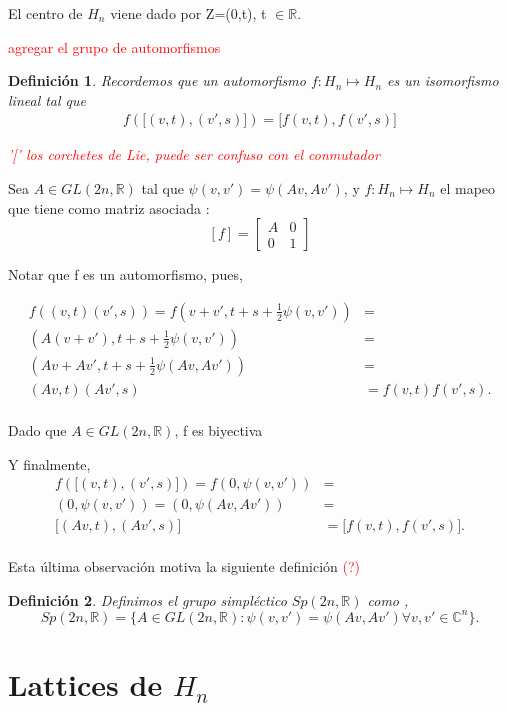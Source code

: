 \documentclass[12pt]{article}
\newtheorem{definition}{Definición}
\begin{document}
El centro de $H_{n}$ viene dado por Z=(0,t), t $\in \mathbb{R}.$

\textcolor{red}{agregar el grupo de automorfismos }
\begin{definition}
 Recordemos que un automorfismo $f: H_n \mapsto H_n$ es un isomorfismo lineal tal que 
 $$\begin{aligned}
    f({[}(v,t),(v',s){]})={[}f(v,t),f(v',s){]}
 \end{aligned}$$
 
 \textcolor{red}{ '[' los corchetes de Lie, puede ser confuso con el conmutador}
\end{definition}

Sea $A \in GL(2n,\mathbb{R})$ tal que  $\psi(v,v')=\psi(Av, Av')$, y  $f:H_n \mapsto H_n$ el mapeo
que tiene como matriz asociada :
$$[f] = 
\begin{bmatrix}
A & 0\\
0 & 1
\end{bmatrix}$$

Notar que f es un automorfismo, pues,

$$\begin{aligned}
f((v,t) (v',s))=f(v+v',t+s+ \frac{1}{2} \psi(v,v'))&=\\
(A(v+v'),t+s+ \frac{1}{2} \psi(v,v'))&=\\
(Av+Av',t+s+ \frac{1}{2} \psi(Av,Av'))&=\\
(Av,t)(Av',s)&=f(v,t) f(v',s).\\
\end{aligned}$$

Dado que $A \in GL(2n,\mathbb{R})$, f es biyectiva

Y finalmente,
$$\begin{aligned}
f({[}(v,t),(v',s){]})=f(0,\psi(v,v'))&=\\
(0,\psi(v,v'))=(0,\psi(Av,Av'))&=\\
{[}(Av,t),(Av',s){]}&={[}f(v,t),f(v',s){]}.\\
\end{aligned}$$

Esta última observación motiva la siguiente definición \textcolor{red}{(?)}
\begin{definition}
 Definimos el grupo simpléctico $Sp(2n,\mathbb{R})$ como ,
 $$
 Sp(2n,\mathbb{R})=\{ A \in GL(2n,\mathbb{R}): \psi(v,v')=\psi(Av,Av') \forall v,v' \in \mathbb{C}^n\}.
 $$
\end{definition}

\section{Lattices de $H_n$}
\end{document}
